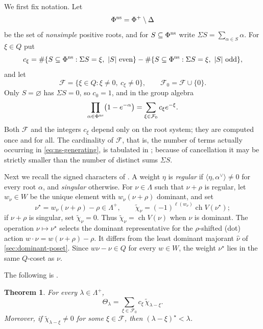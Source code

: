 \documentclass[11pt]{article}
\newtheorem{theorem}{Theorem}[section]
\theoremstyle{definition}
\theoremstyle{remark}
\newcommand{\Raiz}{\Phi}
\newcommand{\RaizSimp}{\Delta}
\newcommand{\RaizReti}{Q}
\newcommand{\Pesos}{\Lambda}
\newcommand{\Weyl}{W}
\newcommand{\chr}{\operatorname{ch}}
\begin{document}
We first fix notation.  Let
\[
   \Raiz^{\rm ns}=\Raiz^+\setminus\RaizSimp
\]
be the set of \emph{nonsimple} positive roots, and for $S\subseteq\Raiz^{\rm ns}$
write $\Sigma S=\sum_{\alpha\in S}\alpha$.  For $\xi\in\RaizReti$ put
\[
   c_\xi=\#\{S\subseteq\Raiz^{\rm ns}:\Sigma S=\xi,\ |S|\text{ even}\}
        -\#\{S\subseteq\Raiz^{\rm ns}:\Sigma S=\xi,\ |S|\text{ odd}\},
\]
and let
\[
   \mathcal F=\{\xi\in\RaizReti:\xi\ne0,\ c_\xi\ne0\},
   \qquad
   \mathcal F_0=\mathcal F\cup\{0\}.
\]
Only $S=\varnothing$ has $\Sigma S=0$, so $c_0=1$, and in the group algebra
\begin{equation}\label{eq:ns-generating}
   \prod_{\alpha\in\Raiz^{\rm ns}}\bigl(1-e^{-\alpha}\bigr)
      =\sum_{\xi\in\mathcal F_0}c_\xi e^{-\xi}.
\end{equation}
Both $\mathcal F$ and the integers $c_\xi$ depend only on the root system;
they are computed once and for all.  The cardinality of $\mathcal F$, that is,
the number of terms actually occurring in \eqref{eq:ns-generating}, is
tabulated in \cite[Table~1]{Schutzer}; because of cancellation it may be
strictly smaller than the number of distinct sums $\Sigma S$.

Next we recall the signed characters of \cite{Schutzer}.  A weight $\eta$
is \emph{regular} if $\langle\eta,\alpha^\vee\rangle\ne0$ for every
root $\alpha$, and \emph{singular} otherwise.  For $\nu\in\Pesos$
such that $\nu+\rho$ is regular, let $w_\nu\in\Weyl$ be the unique element with
$w_\nu(\nu+\rho)$ dominant, and set
\[
   \nu^\star=w_\nu(\nu+\rho)-\rho\in\Pesos^+,
   \qquad
   \widetilde\chi_\nu=(-1)^{\ell(w_\nu)}\chr V(\nu^\star);
\]
if $\nu+\rho$ is singular, set $\widetilde\chi_\nu=0$.  Thus
$\widetilde\chi_\nu=\chr V(\nu)$ when $\nu$ is dominant.  The operation
$\nu\mapsto\nu^\star$ selects the dominant representative for the
$\rho$-shifted (dot) action $w\mathbin{\cdot}\nu=w(\nu+\rho)-\rho$.
It differs from the least dominant majorant $\widehat\nu$ of
\cref{sec:dominant-poset}.  Since $w\nu-\nu\in\RaizReti$ for every $w\in\Weyl$,
the weight $\nu^\star$ lies in the same $\RaizReti$-coset as $\nu$.

The following is \cite[Theorem~2.1]{Schutzer}.

\begin{theorem}
\label{thm:schutzer-girdle}
For every $\lambda\in\Pesos^+$,
\begin{equation}\label{eq:schutzer-girdle}
   \Theta_\lambda=\sum_{\xi\in\mathcal F_0}c_\xi\,\widetilde\chi_{\lambda-\xi}.
\end{equation}
Moreover, if $\widetilde\chi_{\lambda-\xi}\ne0$ for some $\xi\in\mathcal F$,
then $(\lambda-\xi)^\star<\lambda$.
\end{theorem}
\end{document}
